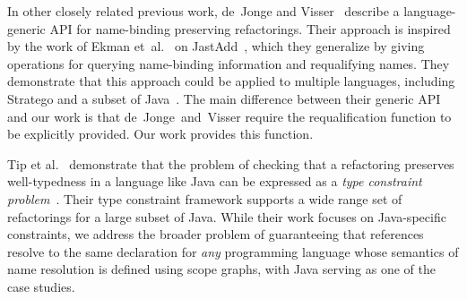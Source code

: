 
In other closely related previous work, de~Jonge and Visser~\cite{JongeV12-LDTA} describe a language-generic API for name-binding preserving refactorings.
Their approach is inspired by the work of Ekman et~al.~\cite{EkmanSV08} on JastAdd~\cite{EkmanH07}, which they generalize by giving operations for querying name-binding information and requalifying names.
They demonstrate that this approach could be applied to multiple languages, including Stratego and a subset of Java~\cite{Visser01,VisserBT98}.
The main difference between their generic API and our work is that de~Jonge~and~Visser require the requalification function to be explicitly provided.
Our work provides this function.


Tip et al.~\cite{Tip07} demonstrate that the problem of checking that a refactoring preserves well-typedness in a language like Java can be expressed as a \emph{type constraint problem}~\cite{PalsbergSchwartzbach94}.
Their type constraint framework supports a wide range set of refactorings for a large subset of Java.
While their work focuses on Java-specific constraints, we address the broader problem of guaranteeing that references resolve to the same declaration for \emph{any} programming language whose semantics of name resolution is defined using scope graphs, with Java serving as one of the case studies.

